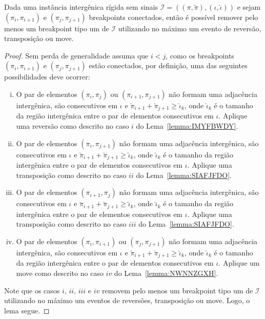 \begin{lemma}\label{lemma:YLNUFQYG}
Dada uma instância intergênica rígida sem sinais $\mathcal{I}=((\pi,\breve\pi),(\iota,\breve\iota))$ e sejam $(\pi_i,\pi_{i+1})$ e $(\pi_j,\pi_{j+1})$ breakpoints conectados, então é possível remover pelo menos um breakpoint tipo um de $\mathcal{I}$ utilizando no máximo um evento de reversão, transposição ou move.
\end{lemma}
\begin{proof}
Sem perda de generalidade assuma que $i < j$, como os breakpoints $(\pi_i,\pi_{i+1})$ e $(\pi_j,\pi_{j+1})$ estão conectados, por definição, uma das seguintes possibilidades deve ocorrer:
\begin{enumerate}[i.]
  \item O par de elementos $(\pi_i,\pi_{j})$ ou $(\pi_{i+1},\pi_{j+1})$ não formam uma adjacência intergênica, são consecutivos em $\iota$ e $\breve\pi_{i+1} + \breve\pi_{j+1} \ge \breve\iota_k$, onde $\breve\iota_k$ é o tamanho da região intergênica entre o par de elementos consecutivos em $\iota$. Aplique uma reversão como descrito no caso $i$ do Lema~\ref{lemma:IMYFBWDY}.
  \item O par  de elementos $(\pi_i,\pi_{j+1})$ não formam uma adjacência intergênica, são consecutivos em $\iota$ e $\breve\pi_{i+1} + \breve\pi_{j+1} \ge \breve\iota_k$, onde $\breve\iota_k$ é o tamanho da região intergênica entre o par de elementos consecutivos em $\iota$. Aplique uma transposição como descrito no caso $ii$ do Lema~\ref{lemma:SIAFJFDO}.
  \item O par de elementos $(\pi_{i+1},\pi_{j})$ não formam uma adjacência intergênica, são consecutivos em $\iota$ e $\breve\pi_{i+1} + \breve\pi_{j+1} \ge \breve\iota_k$, onde $\breve\iota_k$ é o tamanho da região intergênica entre o par de elementos consecutivos em $\iota$. Aplique uma transposição como descrito no caso $iii$ do Lema~\ref{lemma:SIAFJFDO}.
  \item O par de elementos $(\pi_{i},\pi_{i+1})$ ou $(\pi_{j},\pi_{j+1})$ não formam uma adjacência intergênica, são consecutivos em $\iota$ e $\breve\pi_{i+1} + \breve\pi_{j+1} \ge \breve\iota_k$, onde $\breve\iota_k$ é o tamanho da região intergênica entre o par de elementos consecutivos em $\iota$. Aplique um move como descrito no caso $iv$ do Lema~\ref{lemma:NWNNZGXH}.
\end{enumerate}
Note que os casos $i$, $ii$, $iii$ e $iv$ removem pelo menos um breakpoint tipo um de $\mathcal{I}$ utilizando no máximo um eventos de reversões, transposição ou move. Logo, o lema segue. 
\end{proof}

